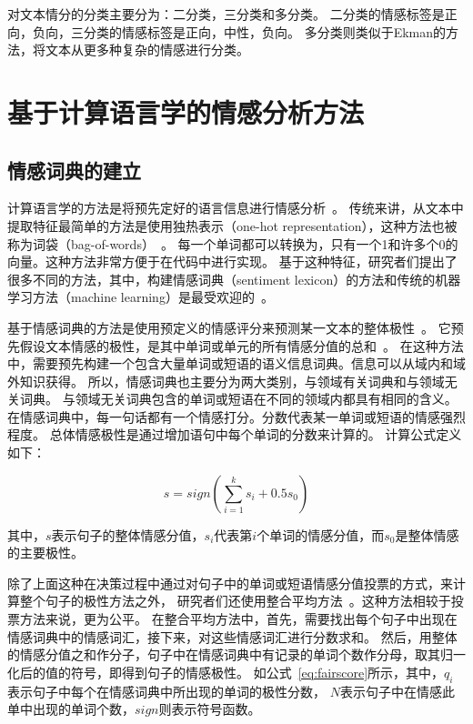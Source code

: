 对文本情分的分类主要分为：二分类，三分类和多分类。
二分类的情感标签是{正向，负向}，三分类的情感标签是{正向，中性，负向}。
多分类则类似于Ekman的方法，将文本从更多种复杂的情感进行分类。

\section{基于计算语言学的情感分析方法}

\subsection{情感词典的建立}
计算语言学的方法是将预先定好的语言信息进行情感分析~。
传统来讲，从文本中提取特征最简单的方法是使用独热表示（one-hot representation），这种方法也被称为词袋（bag-of-words）~。
每一个单词都可以转换为，只有一个1和许多个0的向量。这种方法非常方便于在代码中进行实现。
基于这种特征，研究者们提出了很多不同的方法，其中，构建情感词典（sentiment lexicon）的方法和传统的机器学习方法（machine learning）是最受欢迎的~。

基于情感词典的方法是使用预定义的情感评分来预测某一文本的整体极性~。
它预先假设文本情感的极性，是其中单词或单元的所有情感分值的总和~。
在这种方法中，需要预先构建一个包含大量单词或短语的语义信息词典。信息可以从域内和域外知识获得。
所以，情感词典也主要分为两大类别，与领域有关词典和与领域无关词典。
与领域无关词典包含的单词或短语在不同的领域内都具有相同的含义。
在情感词典中，每一句话都有一个情感打分。分数代表某一单词或短语的情感强烈程度。
总体情感极性是通过增加语句中每个单词的分数来计算的。
计算公式定义如下：

\begin{equation}
s = sign\left(\sum_{i=1}^{k}s_{i}+0.5s_{0}\right )
\end{equation}

其中，${s}$表示句子的整体情感分值，${s_{i}}$代表第${i}$个单词的情感分值，而${s_{0}}$是整体情感的主要极性。

除了上面这种在决策过程中通过对句子中的单词或短语情感分值投票的方式，来计算整个句子的极性方法之外，
研究者们还使用整合平均方法~。这种方法相较于投票方法来说，更为公平。
在整合平均方法中，首先，需要找出每个句子中出现在情感词典中的情感词汇，接下来，对这些情感词汇进行分数求和。
然后，用整体的情感分值之和作分子，句子中在情感词典中有记录的单词个数作分母，取其归一化后的值的符号，即得到句子的情感极性。
如公式~\ref{eq:fairscore}所示，其中，${q_{i}}$表示句子中每个在情感词典中所出现的单词的极性分数，
${N}$表示句子中在情感此单中出现的单词个数，${sign}$则表示符号函数。

